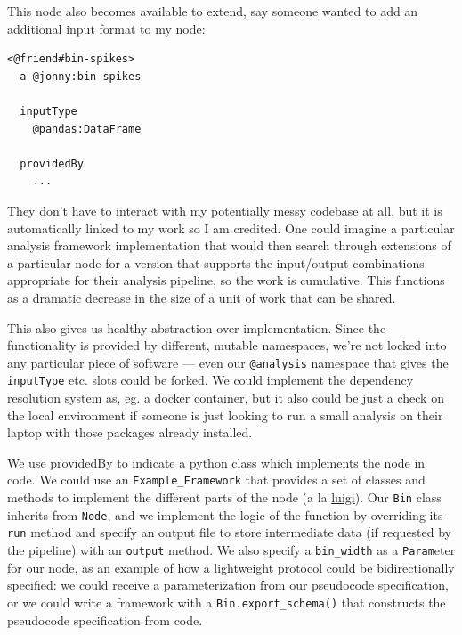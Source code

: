 \documentclass[10pt]{tufte-book}
\begin{document}
This node also becomes available to extend, say someone wanted to add an
additional input format to my node:

\begin{verbatim}
<@friend#bin-spikes>
  a @jonny:bin-spikes

  inputType
    @pandas:DataFrame

  providedBy
    ...
\end{verbatim}

They don't have to interact with my potentially messy codebase at all,
but it is automatically linked to my work so I am credited. One could
imagine a particular analysis framework implementation that would then
search through extensions of a particular node for a version that
supports the input/output combinations appropriate for their analysis
pipeline, so the work is cumulative. This functions as a dramatic
decrease in the size of a unit of work that can be shared.

This also gives us healthy abstraction over implementation. Since the
functionality is provided by different, mutable namespaces, we're not
locked into any particular piece of software --- even our
\texttt{@analysis} namespace that gives the \texttt{inputType} etc.
slots could be forked. We could implement the dependency resolution
system as, eg. a docker container, but it also could be just a check on
the local environment if someone is just looking to run a small analysis
on their laptop with those packages already installed.

We use providedBy to indicate a python class which implements the node
in code. We could use an \texttt{Example\_Framework} that provides a set
of classes and methods to implement the different parts of the node (a
la \href{https://luigi.readthedocs.io/en/stable/tasks.html}{luigi}). Our
\texttt{Bin} class inherits from \texttt{Node}, and we implement the
logic of the function by overriding its \texttt{run} method and specify
an output file to store intermediate data (if requested by the pipeline)
with an \texttt{output} method. We also specify a \texttt{bin\_width} as
a \texttt{Param}eter for our node, as an example of how a lightweight
protocol could be bidirectionally specified: we could receive a
parameterization from our pseudocode specification, or we could write a
framework with a \texttt{Bin.export\_schema()} that constructs the
pseudocode specification from code.
\end{document}
